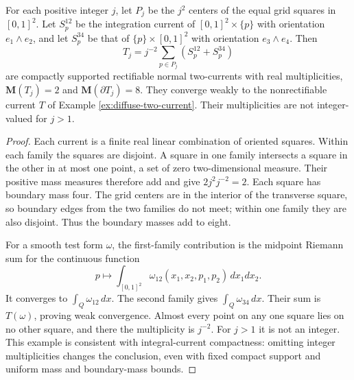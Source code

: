 \begin{proposition}\label{prop:rectifiable-real-diffuse-limit}
For each positive integer $j$, let $P_j$ be the $j^2$ centers of the equal grid squares in $[0,1]^2$. Let $S_p^{12}$ be the integration current of $[0,1]^2\times\{p\}$ with orientation $e_1\wedge e_2$, and let $S_p^{34}$ be that of $\{p\}\times[0,1]^2$ with orientation $e_3\wedge e_4$. Then
\[
 T_j=j^{-2}\sum_{p\in P_j}(S_p^{12}+S_p^{34})
\]
are compactly supported rectifiable normal two-currents with real multiplicities, $\mathbf M(T_j)=2$ and $\mathbf M(\partial T_j)=8$. They converge weakly to the nonrectifiable current $T$ of Example \ref{ex:diffuse-two-current}. Their multiplicities are not integer-valued for $j>1$.
\end{proposition}
\begin{proof}
Each current is a finite real linear combination of oriented squares. Within each family the squares are disjoint. A square in one family intersects a square in the other in at most one point, a set of zero two-dimensional measure. Their positive mass measures therefore add and give $2j^2j^{-2}=2$. Each square has boundary mass four. The grid centers are in the interior of the transverse square, so boundary edges from the two families do not meet; within one family they are also disjoint. Thus the boundary masses add to eight.

For a smooth test form $\omega$, the first-family contribution is the midpoint Riemann sum for the continuous function
\[
 p\longmapsto\int_{[0,1]^2}\omega_{12}(x_1,x_2,p_1,p_2)\,dx_1dx_2.
\]
It converges to $\int_Q\omega_{12}\,dx$. The second family gives $\int_Q\omega_{34}\,dx$. Their sum is $T(\omega)$, proving weak convergence. Almost every point on any one square lies on no other square, and there the multiplicity is $j^{-2}$. For $j>1$ it is not an integer. This example is consistent with integral-current compactness: omitting integer multiplicities changes the conclusion, even with fixed compact support and uniform mass and boundary-mass bounds.
\end{proof}


